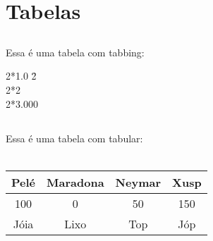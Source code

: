 \documentclass[a4paper,11pt]{report}
\begin{document}
\chapter {Tabelas}
\section{}
Essa é uma tabela com tabbing: %
\begin{tabbing}
2*1.0 \= 2 \\
2*2  \\
2*3.000 
\end{tabbing}
\section{}
Essa é uma tabela com tabular:\\\\
\begin{tabular}{||c|c|c|c||}
\hline
\textbf{Pelé} & \textbf{Maradona} & \textbf{Neymar} & \textbf{Xusp}\\
\hline
100 & 0 & 50 & 150\\
\hline
Jóia & Lixo & Top & Jóp\\
\hline
\end{tabular}
\end{document}
